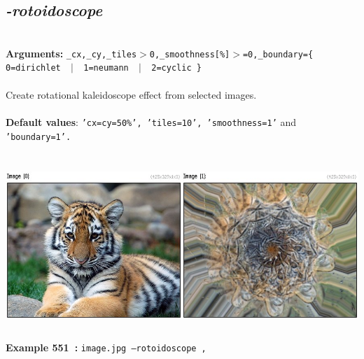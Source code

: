 \documentclass[a4paper,11pt,twoside]{book}
\begin{document}
\subsection{\emph{-rotoidoscope} }\vspace*{-0.5em}
~\\\textbf{Arguments: } 
{\small \texttt{\_cx,\_cy,\_tiles$>$0,\_smoothness[\%]$>$=0,\_boundary=\{ 0=dirichlet ~$|$~ 1=neumann ~$|$~ 2=cyclic \}}}\\~\\
Create rotational kaleidoscope effect from selected images.
~\\~\\\textbf{Default values}: {\small \texttt{'cx=cy=50\%', 'tiles=10', 'smoothness=1'} and \texttt{'boundary=1'.}}
\begin{center}\includegraphics[keepaspectratio=true,height=7cm,width=\textwidth]{img/gmic_def551.jpg}\\
{\footnotesize \textbf{Example 551~:} \texttt{image.jpg --rotoidoscope ,}}
\end{center}
\end{document}
